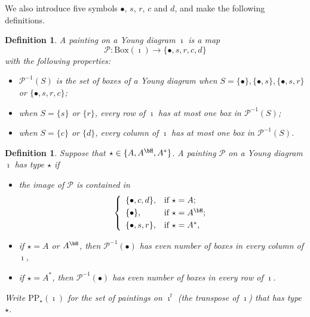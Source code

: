 \documentclass[12pt,a4paper]{amsart}
\newcommand{\CP}{{\mathcal {P}}}
\numberwithin{equation}{section}
\newtheorem{defn}[thm]{Definition}
\theoremstyle{remark}
\def\CP{\mathsf{CP}}
\begin{document}

\renewcommand{\CP}{\mathcal{P}}
We also introduce five symbols $\bullet$, $s$, $r$, $c$ and $d$, and make the following definitions.
\begin{defn}
A painting on a Young diagram $\imath$ is a map
\[
  \mathcal P: \mathrm{Box}(\imath) \rightarrow \{\bullet, s, r, c, d \}
\]
with the following properties:
\begin{itemize}
\item
 $\mathcal P^{-1}(S)$ is the set of boxes of a Young diagram when $S=\{\bullet\}, \{\bullet, s \}, \{\bullet, s, r\}$ or $\{\bullet, s, r, c \} $;
 \item
 when $S=\{s\}$ or $ \{r\}$, every row of $\imath$ has at most one  box in $\CP^{-1}(S)$;
   \item
 when $S=\{c\}$ or $ \{d \}$, every column of $\imath$ has at most one  box in $\CP^{-1}(S)$.
 \end{itemize}
\end{defn}



\begin{defn}\label{defpbp0}
Suppose that $\star\in \{A, A^\bH, A^*\}$.  A painting $\CP$ on a Young diagram $\imath$ has type $\star$ if 
 \begin{itemize}
   \item 
 the image of $\CP$ is contained in
 \[
 \left\{
     \begin{array}{ll}
         \{\bullet, c, d\}, &\hbox{if $\star=A$}; \smallskip\\
            \{\bullet\}, &\hbox{if $\star=A^\bH$}; \smallskip\\
          \{\bullet, s, r\}, &\hbox{if $\star=A^*$},            \end{array}
   \right.
 \]
 \item
 if $\star=A$ or $A^\bH$, then $\CP^{-1}(\bullet)$ has even number of boxes in every column of $\imath$, 
  \item
 if $\star=A^*$, then $\CP^{-1}(\bullet)$ has even number of boxes in every row of $\imath$.
 \end{itemize}
 Write $\mathrm{PP}_\star(\imath)$ for the set of paintings on $\imath^t$ (the transpose of $\imath$) that has type $\star$.
 \end{defn}
\end{document}
